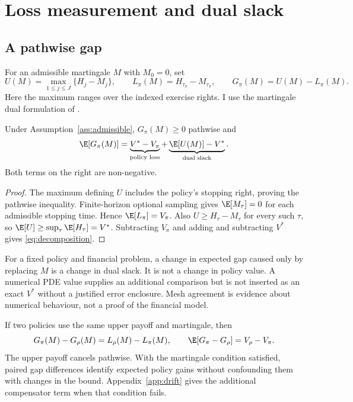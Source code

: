 \section{Loss measurement and dual slack}

\subsection{A pathwise gap}

For an admissible martingale $M$ with $M_0=0$, set
\begin{equation}
 U(M)=\max_{1\leq j\leq J}\{H_j-M_j\},\qquad
 L_\pi(M)=H_{\tau_\pi}-M_{\tau_\pi},\qquad
 G_\pi(M)=U(M)-L_\pi(M).
\label{eq:gap}
\end{equation}
Here the maximum ranges over the indexed exercise rights. I use the martingale dual formulation of \citet{haugh2004}.

\begin{proposition}
Under Assumption~\ref{ass:admissible}, $G_\pi(M)\geq0$ pathwise and
\begin{equation}
 \E[G_\pi(M)]
 =\underbrace{V^*-V_\pi}_{\text{policy loss}}
 +\underbrace{\E[U(M)]-V^*}_{\text{dual slack}}.
\label{eq:decomposition}
\end{equation}
Both terms on the right are non-negative.
\end{proposition}
\begin{proof}
The maximum defining $U$ includes the policy's stopping right, proving the pathwise inequality. Finite-horizon optional sampling gives $\E[M_\tau]=0$ for each admissible stopping time. Hence $\E[L_\pi]=V_\pi$. Also $U\geq H_\tau-M_\tau$ for every such $\tau$, so $\E[U]\geq\sup_\tau\E[H_\tau]=V^*$. Subtracting $V_\pi$ and adding and subtracting $V^*$ gives \eqref{eq:decomposition}.
\end{proof}

For a fixed policy and financial problem, a change in expected gap caused only by replacing $M$ is a change in dual slack. It is not a change in policy value. A numerical PDE value supplies an additional comparison but is not inserted as an exact $V^*$ without a justified error enclosure. Mesh agreement is evidence about numerical behaviour, not a proof of the financial model.

If two policies use the same upper payoff and martingale, then
\begin{equation}
 G_\pi(M)-G_\rho(M)=L_\rho(M)-L_\pi(M),\qquad
 \E[G_\pi-G_\rho]=V_\rho-V_\pi.
\label{eq:common-upper}
\end{equation}
The upper payoff cancels pathwise. With the martingale condition satisfied, paired gap differences identify expected policy gains without confounding them with changes in the bound. Appendix~\ref{app:drift} gives the additional compensator term when that condition fails.

